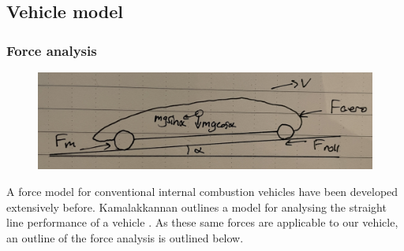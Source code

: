 \documentclass[11pt]{article}
\numberwithin{equation}{section}
\begin{document}
\subsection{Vehicle model}
\subsubsection{Force analysis}
\begin{figure}[H]
    \centering
    \includegraphics[width = \textwidth]{./img/vehicleSketch1.jpg}
\end{figure}
A force model for conventional internal combustion vehicles have been developed extensively before. Kamalakkannan outlines a model for analysing the straight line performance of a vehicle \citep{balaji}. As these same forces are applicable to our vehicle, an outline of the force analysis is outlined below. 
\end{document}
